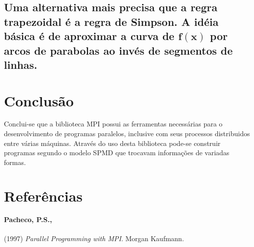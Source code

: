 \documentclass[11pt,a4paper,onecolumn]{article}
\begin{document}
\subsection{Uma alternativa mais precisa que a regra trapezoidal é a regra de Simpson. A idéia básica é de aproximar a curva de $\mathbf{f(x)}$ por arcos de parabolas ao invés de segmentos de linhas. }

\section{Conclusão}
Conclui-se que a biblioteca MPI possui as ferramentas necessárias para o desenvolvimento de programas paralelos, inclusive com seus processos distribuidos entre várias máquinas.
Através do uso desta biblioteca pode-se construir programas segundo o modelo SPMD que trocavam informações de variadas formas.

\section{Referências}
\paragraph{Pacheco, P.S.,} (1997) \textit{Parallel Programming with MPI}. Morgan Kaufmann.
\end{document}
